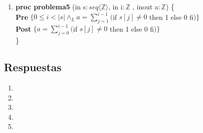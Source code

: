 \documentclass{article}
\begin{document}
\begin{enumerate}[label=\alph*)]
\item \textbf{proc problema5 }(in s$: seq\langle \mathbb{Z}\rangle$, in i$:\mathbb{Z}$
	, inout a$: \mathbb{Z}$) \{\smallskip \\                            
    \hspace*{6mm} \textbf{Pre }$\{0 \leq i < |s| \wedge_L a=\sum_{j=1}^{i-1}($if $s[j] \neq 0$ 
    then 1 else 0 fi$)\}$\smallskip \\          
   \hspace*{6mm} \textbf{Post }$\{a=\sum_{j=0}^{i-1}($if $s[j] \neq 0$ 
    then 1 else 0 fi$)\}$\\
   \}                        
\end{enumerate}

\subsection*{Respuestas}

\begin{enumerate}[label=\alph*)]
	\item
	\item
	\item
	\item
	\item
\end{enumerate}
\end{document}
